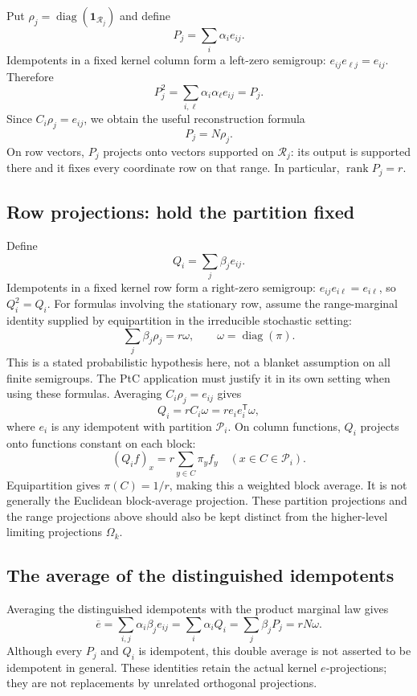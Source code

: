 Put $\rho_j=\operatorname{diag}(\mathbf1_{\mathcal R_j})$ and define
\[
 P_j=\sum_i\alpha_i e_{ij}.
\]
Idempotents in a fixed kernel column form a left-zero semigroup:
$e_{ij}e_{\ell j}=e_{ij}$. Therefore
\[
 P_j^2=\sum_{i,\ell}\alpha_i\alpha_\ell e_{ij}=P_j.
\]
Since $C_i\rho_j=e_{ij}$, we obtain the useful reconstruction formula
\[
 \boxed{P_j=N\rho_j.}
\]
On row vectors, $P_j$ projects onto vectors supported on $\mathcal R_j$:
its output is supported there and it fixes every coordinate row on that
range. In particular, $\operatorname{rank}P_j=r$.

\subsection{Row projections: hold the partition fixed}
\label{notation:partition-projections}

Define
\[
 Q_i=\sum_j\beta_j e_{ij}.
\]
Idempotents in a fixed kernel row form a right-zero semigroup:
$e_{ij}e_{i\ell}=e_{i\ell}$, so $Q_i^2=Q_i$.
For formulas involving the stationary row, assume the range-marginal
identity supplied by equipartition in the irreducible stochastic setting:
\[
 \sum_j\beta_j\rho_j=r\omega,\qquad
 \omega=\operatorname{diag}(\pi).
\]
This is a stated probabilistic hypothesis here, not a blanket assumption
on all finite semigroups. The PtC application must justify it in its own
setting when using these formulas. Averaging $C_i\rho_j=e_{ij}$ gives
\[
 \boxed{Q_i=rC_i\omega=r e_i e_i^{\mathsf T}\omega,}
\]
where $e_i$ is any idempotent with partition $\mathcal P_i$.
On column functions, $Q_i$ projects onto functions constant on each block:
\[
 (Q_i f)_x=r\sum_{y\in C}\pi_y f_y\quad(x\in C\in\mathcal P_i).
\]
Equipartition gives $\pi(C)=1/r$, making this a weighted block average.
It is not generally the Euclidean block-average projection. These
partition projections and the range projections above should also be
kept distinct from the higher-level limiting projections $\Omega_k$.

\subsection{The average of the distinguished idempotents}
\label{notation:average-idempotents}

Averaging the distinguished idempotents with the product marginal law gives
\[
 \boxed{\overline e=\sum_{i,j}\alpha_i\beta_j e_{ij}
 =\sum_i\alpha_iQ_i=\sum_j\beta_jP_j=rN\omega.}
\]
Although every $P_j$ and $Q_i$ is idempotent, this double average is not
asserted to be idempotent in general. These identities retain the actual
kernel $e$-projections; they are not replacements by unrelated orthogonal
projections.

